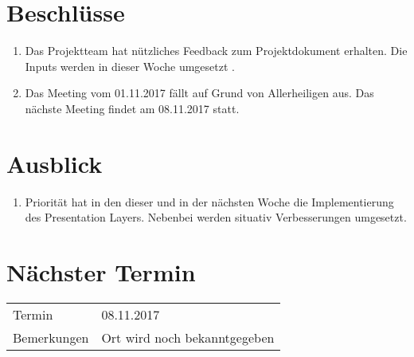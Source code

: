 \documentclass[11pt, a4paper,oneside]{scrartcl}
\begin{document}
\section{Beschlüsse}
\begin{enumerate}
	\item Das Projektteam hat nützliches Feedback zum Projektdokument erhalten. Die Inputs werden in dieser Woche umgesetzt . 
	\item Das Meeting vom 01.11.2017 fällt auf Grund von Allerheiligen aus. Das nächste Meeting findet am 08.11.2017 statt.
\end{enumerate}

\section{Ausblick}
\begin{enumerate}
	\item Priorität hat in den dieser und in der nächsten Woche die Implementierung des Presentation Layers. Nebenbei werden situativ Verbesserungen umgesetzt. 
\end{enumerate}

\section{Nächster Termin}
\begin{tabu} to \linewidth {l X }
	\toprule
	Termin & 08.11.2017  \\
	Bemerkungen & Ort wird noch bekanntgegeben   \\
	\bottomrule
\end{tabu}
\end{document}
